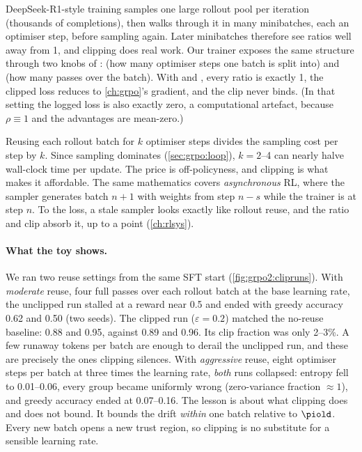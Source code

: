 DeepSeek-R1-style training samples one large rollout pool per iteration (thousands of
completions), then walks through it in many minibatches, each an optimiser step, before
sampling again. Later minibatches therefore see ratios well away from 1, and clipping does
real work. Our trainer exposes the same structure through two knobs of
:  (how many optimiser steps one batch is split into) and
 (how many passes over the batch). With  and
, every ratio is exactly 1, the clipped loss reduces to
\cref{ch:grpo}'s gradient, and the clip never binds. (In that setting the logged loss is also
exactly zero, a computational artefact, because $\rho\equiv1$ and the advantages are
mean-zero.)

\begin{systemslens}
Reusing each rollout batch for $k$ optimiser steps divides the sampling cost per step by
$k$. Since sampling dominates (\cref{sec:grpo:loop}), $k=2$--4 can nearly halve wall-clock time
per update. The price is off-policyness, and clipping is what makes it affordable. The same
mathematics covers \emph{asynchronous} RL, where the sampler generates batch $n{+}1$ with
weights from step $n-s$ while the trainer is at step $n$. To the loss, a stale sampler looks
exactly like rollout reuse, and the ratio and clip absorb it, up to a point (\cref{ch:rlsys}).
\end{systemslens}

\paragraph{What the toy shows.} We ran two reuse settings from the same SFT start
(\cref{fig:grpo2:clipruns}). With \emph{moderate} reuse, four full passes over each rollout
batch at the base learning rate, the unclipped run stalled at a reward near 0.5 and ended
with greedy accuracy 0.62 and 0.50 (two seeds). The clipped run ($\varepsilon=0.2$) matched
the no-reuse baseline: 0.88 and 0.95, against 0.89 and 0.96. Its clip fraction was only
2--3\%. A few runaway tokens per batch are enough to derail the unclipped run, and these
are precisely the ones clipping silences. With \emph{aggressive} reuse, eight optimiser steps
per batch at three times the learning rate, \emph{both} runs collapsed: entropy fell to
0.01--0.06, every group became uniformly wrong (zero-variance fraction $\approx1$), and greedy
accuracy ended at 0.07--0.16. The lesson is about what clipping does and does not bound. It
bounds the drift \emph{within} one batch relative to $\piold$. Every new batch opens a new
trust region, so clipping is no substitute for a sensible learning rate.

